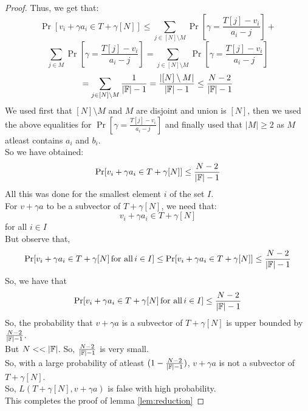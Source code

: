 \begin{proof}
    Thus, we get that:
    $$\Pr[v_i +\gamma a_i \in T+\gamma[N]] \leq \sum_{j \in [N]\setminus M} \Pr\left[\gamma = \frac{T[j]-v_i}{a_i-j}\right]+$$
    $$\sum_{j \in M} \Pr\left[\gamma = \frac{T[j]-v_i}{a_i-j}\right]=\sum_{j \in [N]\setminus M} \Pr\left[\gamma = \frac{T[j]-v_i}{a_i-j}\right]$$
    $$=\sum_{j \in [N]\setminus M} \frac{1}{|\mathbb{F}|-1}=\frac{|[N]\setminus M|}{|\mathbb{F}|-1} \leq \frac{N-2}{|\mathbb{F}|-1}$$
    We used first that $[N]\setminus M$ and $M$ are disjoint and union is $[N]$, then we used the above equalities for $\Pr\left[\gamma = \frac{T[j]-v_i}{a_i-j}\right]$ and finally used that $|M| \geq 2$ as $M$ atleast contains $a_i$ and $b_i$.\\
    So we have obtained:
    $$\Pr[v_i +\gamma a_i \in T+\gamma[N]] \leq \frac{N-2}{|\mathbb{F}|-1}$$
    All this was done for the smallest element $i$ of the set $I$.\\
    For $v+\gamma a$ to be a subvector of $T+\gamma [N]$, we need that:
    $$v_i +\gamma a_i \in T+\gamma[N]$$ for all $i \in I$\\
    But observe that,
    $$\Pr[v_i +\gamma a_i \in T+\gamma[N] \, \text{for all} \, i \in I] \leq \Pr[v_i +\gamma a_i \in T+\gamma[N]] \leq \frac{N-2}{|\mathbb{F}|-1}$$
    So, we have that $$\Pr[v_i +\gamma a_i \in T+\gamma[N] \, \text{for all} \,i \in I] \leq \frac{N-2}{|\mathbb{F}|-1}$$
    So, the probability that $v+\gamma a$ is a subvector of $T+\gamma [N]$ is upper bounded by $\frac{N-2}{|\mathbb{F}|-1}$. \\
    But $N <<|\F|$. So, $\frac{N-2}{|\mathbb{F}|-1}$ is very small. \\
    So, with a large probability of atleast $(1-\frac{N-2}{|\mathbb{F}|-1})$, $v+\gamma a$ is not a subvector of $T+\gamma [N]$. \\
    So, $L(T+\gamma[N], v+\gamma a)$ is false with high probability. \\
    This completes the proof of lemma \ref{lem:reduction}
\end{proof}